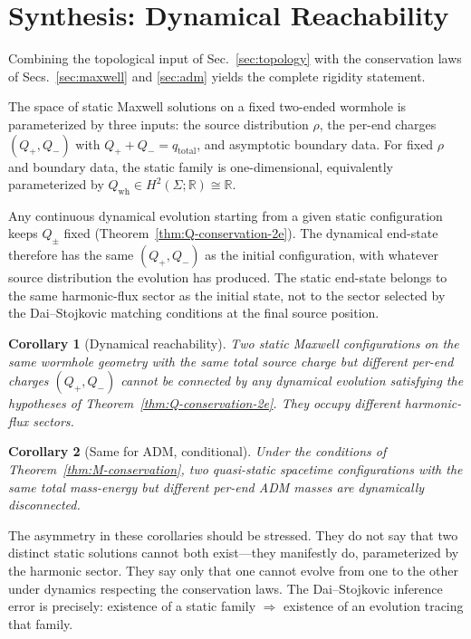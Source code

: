 \documentclass[aps,prd,onecolumn,nofootinbib,superscriptaddress]{revtex4-2}
\newtheorem{corollary}{Corollary}
\begin{document}
\section{Synthesis: Dynamical Reachability}
\label{sec:synthesis}

Combining the topological input of Sec.~\ref{sec:topology} with the
conservation laws of Secs.~\ref{sec:maxwell} and \ref{sec:adm} yields the
complete rigidity statement.

The space of static Maxwell solutions on a fixed two-ended wormhole is
parameterized by three inputs: the source distribution $\rho$, the per-end
charges $(Q_+,Q_-)$ with $Q_++Q_-=q_{\mathrm{total}}$, and asymptotic boundary
data.  For fixed $\rho$ and boundary data, the static family is
one-dimensional, equivalently parameterized by $Q_{\mathrm{wh}}\in H^2(\Sigma;\mathbb{R})\cong\mathbb{R}$.

Any continuous dynamical evolution starting from a given static configuration
keeps $Q_\pm$ fixed (Theorem~\ref{thm:Q-conservation-2e}).  The dynamical
end-state therefore has the same $(Q_+,Q_-)$ as the initial configuration,
with whatever source distribution the evolution has produced.  The static
end-state belongs to the same harmonic-flux sector as the initial state, not
to the sector selected by the Dai--Stojkovic matching conditions at the final
source position.

\begin{corollary}[Dynamical reachability]
\label{cor:reachability}
Two static Maxwell configurations on the same wormhole geometry with the same
total source charge but different per-end charges $(Q_+,Q_-)$ cannot be
connected by any dynamical evolution satisfying the hypotheses of
Theorem~\ref{thm:Q-conservation-2e}.  They occupy different harmonic-flux
sectors.
\end{corollary}

\begin{corollary}[Same for ADM, conditional]
\label{cor:reachability-adm}
Under the conditions of Theorem~\ref{thm:M-conservation}, two quasi-static
spacetime configurations with the same total mass-energy but different per-end
ADM masses are dynamically disconnected.
\end{corollary}

The asymmetry in these corollaries should be stressed.  They do not say that
two distinct static solutions cannot both exist---they manifestly do, parameterized
by the harmonic sector.  They say only that one cannot evolve from one to the
other under dynamics respecting the conservation laws.  The Dai--Stojkovic
inference error is precisely: existence of a static family $\Rightarrow$
existence of an evolution tracing that family.
\end{document}
